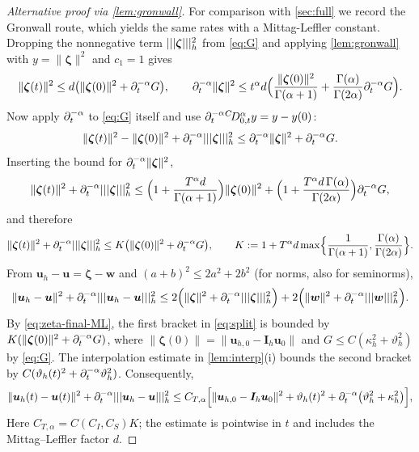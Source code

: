 \begin{proof}[Alternative proof via \cref{lem:gronwall}]
For comparison with \cref{sec:full} we record the Gronwall route, which yields the same rates with a Mittag-Leffler constant.
Dropping the nonnegative term $|||\bm\zeta|||_h^2$ from \eqref{eq:G} and applying \cref{lem:gronwall} with $y=\|\bm\zeta\|^2$ and $c_1=1$ gives
\[
\|\bm\zeta(t)\|^2\le d\bigl(\|\bm\zeta(0)\|^2+\partial_t^{-\alpha} G\bigr),\qquad
\partial_t^{-\alpha}\|\bm\zeta\|^2\le t^\alpha d\Bigl(\frac{\|\bm\zeta(0)\|^2}{\Gamma(\alpha+1)}+\frac{\Gamma(\alpha)}{\Gamma(2\alpha)}\partial_t^{-\alpha} G\Bigr).
\]
Now apply $\partial_t^{-\alpha}$ to \eqref{eq:G} itself and use $\partial_t^{-\alpha}{}^{C}\!D_{0,t}^{\alpha} y=y-y(0)$:
\[
\|\bm\zeta(t)\|^2-\|\bm\zeta(0)\|^2+\partial_t^{-\alpha}|||\bm\zeta|||_h^2\le\partial_t^{-\alpha}\|\bm\zeta\|^2+\partial_t^{-\alpha} G .
\]
Inserting the bound for $\partial_t^{-\alpha}\|\bm\zeta\|^2$,
\[
\|\bm\zeta(t)\|^2+\partial_t^{-\alpha}|||\bm\zeta|||_h^2\le\Bigl(1+\frac{T^\alpha d}{\Gamma(\alpha+1)}\Bigr)\|\bm\zeta(0)\|^2+\Bigl(1+\frac{T^\alpha d\,\Gamma(\alpha)}{\Gamma(2\alpha)}\Bigr)\partial_t^{-\alpha} G ,
\]
and therefore
\begin{equation}\label{eq:zeta-final-ML}
\|\bm\zeta(t)\|^2+\partial_t^{-\alpha}|||\bm\zeta|||_h^2\le K\bigl(\|\bm\zeta(0)\|^2+\partial_t^{-\alpha} G\bigr),\qquad
K:=1+T^\alpha d\max\Bigl\{\frac1{\Gamma(\alpha+1)},\frac{\Gamma(\alpha)}{\Gamma(2\alpha)}\Bigr\}.
\end{equation}
From $\bm u_h-\bm u=\bm\zeta-\bm w$ and $(a+b)^2\le2a^2+2b^2$ (for norms, also for seminorms),
\begin{equation}\label{eq:split}
\|\bm u_h-\bm u\|^2+\partial_t^{-\alpha}|||\bm u_h-\bm u|||_h^2\le2\Bigl(\|\bm\zeta\|^2+\partial_t^{-\alpha}|||\bm\zeta|||_h^2\Bigr)+2\Bigl(\|\bm w\|^2+\partial_t^{-\alpha}|||\bm w|||_h^2\Bigr).
\end{equation}
By \eqref{eq:zeta-final-ML}, the first bracket in \eqref{eq:split} is bounded by $K(\|\bm\zeta(0)\|^2+\partial_t^{-\alpha} G)$, where $\|\bm\zeta(0)\|=\|\bm u_{h,0}-\bm I_h\bm u_0\|$ and $G\le C(\kappa_h^2+\vartheta_h^2)$ by \eqref{eq:G}. The interpolation estimate in \cref{lem:interp}(i) bounds the second bracket by $C(\vartheta_h(t)^2+\partial_t^{-\alpha}\vartheta_h^2)$. Consequently,
\[
\|\bm u_h(t)-\bm u(t)\|^2+\partial_t^{-\alpha}|||\bm u_h-\bm u|||_h^2\le C_{T,\alpha}\Bigl[\|\bm u_{h,0}-\bm I_h\bm u_0\|^2+\vartheta_h(t)^2+\partial_t^{-\alpha}\bigl(\vartheta_h^2+\kappa_h^2\bigr)\Bigr],
\]
Here $C_{T,\alpha}=C(C_I,C_S)K$; the estimate is pointwise in $t$ and includes the Mittag--Leffler factor $d$.
\end{proof}


